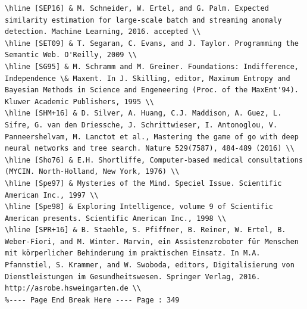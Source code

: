 \documentclass[10pt]{article}
\begin{document}
\begin{verbatim}
\hline [SEP16] & M. Schneider, W. Ertel, and G. Palm. Expected similarity estimation for large-scale batch and streaming anomaly detection. Machine Learning, 2016. accepted \\
\hline [SET09] & T. Segaran, C. Evans, and J. Taylor. Programming the Semantic Web. O'Reilly, 2009 \\
\hline [SG95] & M. Schramm and M. Greiner. Foundations: Indifference, Independence \& Maxent. In J. Skilling, editor, Maximum Entropy and Bayesian Methods in Science and Engeneering (Proc. of the MaxEnt'94). Kluwer Academic Publishers, 1995 \\
\hline [SHM+16] & D. Silver, A. Huang, C.J. Maddison, A. Guez, L. Sifre, G. van den Driessche, J. Schrittwieser, I. Antonoglou, V. Panneershelvam, M. Lanctot et al., Mastering the game of go with deep neural networks and tree search. Nature 529(7587), 484-489 (2016) \\
\hline [Sho76] & E.H. Shortliffe, Computer-based medical consultations (MYCIN. North-Holland, New York, 1976) \\
\hline [Spe97] & Mysteries of the Mind. Speciel Issue. Scientific American Inc., 1997 \\
\hline [Spe98] & Exploring Intelligence, volume 9 of Scientific American presents. Scientific American Inc., 1998 \\
\hline [SPR+16] & B. Staehle, S. Pfiffner, B. Reiner, W. Ertel, B. Weber-Fiori, and M. Winter. Marvin, ein Assistenzroboter für Menschen mit körperlicher Behinderung im praktischen Einsatz. In M.A. Pfannstiel, S. Krammer, and W. Swoboda, editors, Digitalisierung von Dienstleistungen im Gesundheitswesen. Springer Verlag, 2016. http://asrobe.hsweingarten.de \\
%---- Page End Break Here ---- Page : 349


\end{verbatim}
\end{document}
